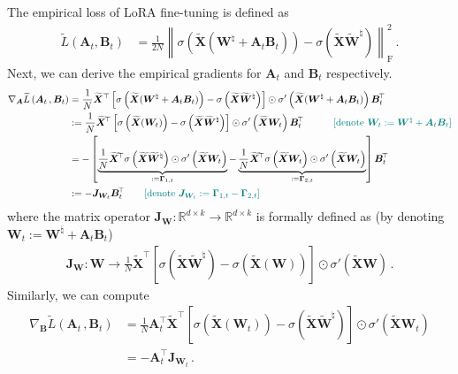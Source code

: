 The empirical loss of LoRA fine-tuning is defined as
\begin{equation*}
    \begin{split}
        \widetilde{L}\left(\bm A_t, \bm B_t\right) & 
    = \frac{1}{2N}\left\|\sigma\left(\widetilde{\bm X}( \bm W^{\natural} + \bm A_t \bm B_t) \right) - \sigma\left(\widetilde{\bm X}\widetilde{\bm W}^\natural\right)\right\|_{\mathrm{F}}^2\,.
    \end{split}
\end{equation*}
Next, we can derive the empirical gradients for $\bm A_t$ and $\bm B_t$ respectively.
\begin{align}
       \nabla_{\bm A}\widetilde{L}\left(\bm A_t\,,\bm B_t\right) & = \frac{1}{N} \widetilde{\bm X}^{\top} \left[ \sigma\left(\widetilde{\bm X}(\bm W^{\natural} + \bm A_t \bm B_t) \right) - \sigma\left(\widetilde{\bm X}\widetilde{\bm W}^\natural\right) \right] \odot \sigma'\left(\widetilde{\bm X}(\bm W^{\natural} + \bm A_t \bm B_t)\right) \bm B_t^{\!\top}\nonumber\\
       & := \frac{1}{N} \widetilde{\bm X}^{\!\top} \left[ \sigma\left(\widetilde{\bm X}(\bm W_t) \right) - \sigma\left(\widetilde{\bm X}\widetilde{\bm W}^\natural\right) \right] \odot \sigma'\left(\widetilde{\bm X}\bm W_t\right) \bm B_t^{\!\top} \quad \tag*{\color{teal}[denote $\bm W_t := \bm W^{\natural} + \bm A_t \bm B_t$]}\nonumber\\
       & = - \left[ \underbrace{\frac{1}{N}\widetilde{\bm X}^{\!\top}\sigma\left(\widetilde{\bm X}\widetilde{\bm W}^\natural\right)\odot \sigma'\left(\widetilde{\bm X}\bm W_t\right)}_{:=\bm \Gamma_{1,t}}
    - \underbrace{\frac{1}{N}\widetilde{\bm X}^{\!\top}\sigma\left(\widetilde{\bm X}\bm W_t\right)\odot \sigma'\left(\widetilde{\bm X}\bm W_t\right)}_{:=\bm \Gamma_{2,t}} \right] \bm B_t^{\!\top}\label{I-def}\\
    & := - \bm J_{\bm W_t} \bm B_t^{\!\top} \tag*{\color{teal}[denote $\bm J_{\bm W_t} := \bm \Gamma_{1,t} - \bm \Gamma_{2,t}$]}\nonumber
\end{align}
where the matrix operator $\bm J_{\bm W}: \mathbb{R}^{d \times k} \rightarrow \mathbb{R}^{d \times k}$ is formally defined as (by denoting $\bm W_t := \bm W^{\natural} + \bm A_t \bm B_t$)
\begin{align}\label{JW}
    \bm J_{\bm W}:\bm W \rightarrow \frac{1}{N} \widetilde{\bm X}^{\!\top} \left[\sigma\left(\widetilde{\bm X}\widetilde{\bm W}^\natural\right)-\sigma\left(\widetilde{\bm X}(\bm W) \right)\right] \odot \sigma'\left(\widetilde{\bm X}\bm W\right)\,.
\end{align}
Similarly, we can compute
\begin{align*}
    \nabla_{\bm B}\widetilde{L}\left(\bm A_t\,,\bm B_t\right) & = \frac{1}{N} \bm A_t^{\!\top} \widetilde{\bm X}^{\!\top} \left[ \sigma\left(\widetilde{\bm X}(\bm W_t) \right) - \sigma\left(\widetilde{\bm X}\widetilde{\bm W}^\natural\right) \right] \odot \sigma'\left(\widetilde{\bm X}\bm W_t\right)\\
    & = - \bm A_t^{\!\top}\bm J_{\bm W_t}\,.
\end{align*}


